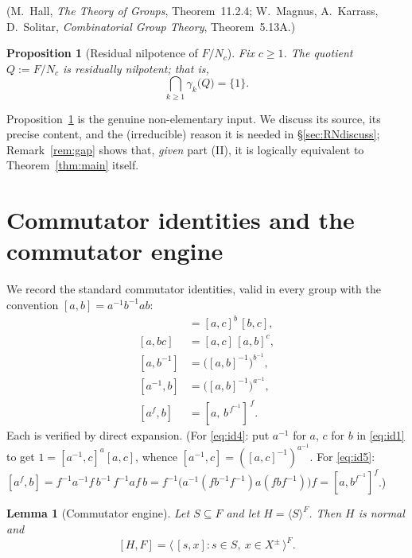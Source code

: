 \documentclass{amsart}
\newtheorem{lemma}{Lemma}
\newtheorem{proposition}{Proposition}
\theoremstyle{definition}
\theoremstyle{remark}
\begin{document}
\noindent
(M.\ Hall, \emph{The Theory of Groups}, Theorem~11.2.4; W.\ Magnus, A.\ Karrass,
D.\ Solitar, \emph{Combinatorial Group Theory}, Theorem~5.13A.)

\begin{proposition}[Residual nilpotence of $F/N_c$]\label{prop:RN}
Fix $c\ge1$. The quotient $Q:=F/N_c$ is residually nilpotent; that is,
\[
\bigcap_{k\ge1}\gamma_k\!\big(Q\big)=\{1\}.
\]
\end{proposition}

\noindent
Proposition~\ref{prop:RN} is the genuine non-elementary input. We discuss its
source, its precise content, and the (irreducible) reason it is needed in
\S\ref{sec:RNdiscuss}; Remark~\ref{rem:gap} shows that, \emph{given} part (II), it
is logically equivalent to Theorem~\ref{thm:main} itself.

\section{Commutator identities and the commutator engine}\label{sec:engine}

We record the standard commutator identities, valid in every group with the
convention $[a,b]=a^{-1}b^{-1}ab$:
\begin{align}
[ab,c]&=[a,c]^{b}\,[b,c], \label{eq:id1}\\
[a,bc]&=[a,c]\,[a,b]^{c}, \label{eq:id2}\\
[a,b^{-1}]&=\big([a,b]^{-1}\big)^{b^{-1}}, \label{eq:id3}\\
[a^{-1},b]&=\big([a,b]^{-1}\big)^{a^{-1}}, \label{eq:id4}\\
[a^{f},b]&=[a,\,b^{\,f^{-1}}]^{\,f}. \label{eq:id5}
\end{align}
Each is verified by direct expansion. (For \eqref{eq:id4}: put $a^{-1}$ for $a$,
$c$ for $b$ in \eqref{eq:id1} to get $1=[a^{-1},c]^{a}[a,c]$, whence
$[a^{-1},c]=([a,c]^{-1})^{a^{-1}}$. For \eqref{eq:id5}:
$[a^f,b]=f^{-1}a^{-1}f\,b^{-1}\,f^{-1}af\,b
=f^{-1}\big(a^{-1}(fb^{-1}f^{-1})a(fbf^{-1})\big)f=[a,b^{f^{-1}}]^{f}$.)

\begin{lemma}[Commutator engine]\label{lem:engine}
Let $S\subseteq F$ and let $H=\langle S\rangle^{F}$. Then $H$ is normal and
\begin{equation}\label{eq:engine}
[H,F]=\big\langle\,[s,x] : s\in S,\ x\in X^{\pm}\,\big\rangle^{F}.
\end{equation}
\end{lemma}
\end{document}
